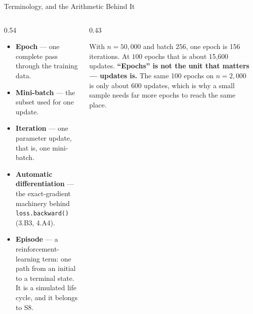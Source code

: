 \begin{frame}{Terminology, and the Arithmetic Behind It}
\begin{columns}[T]
\begin{column}{0.54\textwidth}
\small
\begin{itemize}\small\setlength{\itemsep}{1.2mm}
  \item \textbf{Epoch} --- one complete pass through the training data.
  \item \textbf{Mini-batch} --- the subset used for one update.
  \item \textbf{Iteration} --- one parameter update, that is, one mini-batch.
  \item \textbf{Automatic differentiation} --- the exact-gradient machinery behind \texttt{loss.backward()} (3.B3, 4.A4).
  \item \textbf{Episode} --- a reinforcement-learning term: one path from an initial to a terminal state. It is a simulated life cycle, and it belongs to S8.
\end{itemize}
\end{column}
\begin{column}{0.43\textwidth}
\begin{conceptbox}[title=\textbf{Do the arithmetic once}]\small
With $n=50{,}000$ and batch $256$, one epoch is 156 iterations. At $100$ epochs that is about 15{,}600 updates.
\medskip
\textbf{``Epochs'' is not the unit that matters --- updates is.} The same 100 epochs on $n=2{,}000$ is only about 600 updates, which is why a small sample needs far more epochs to reach the same place.
\end{conceptbox}
\end{column}
\end{columns}
\vspace{1mm}
\end{frame}

